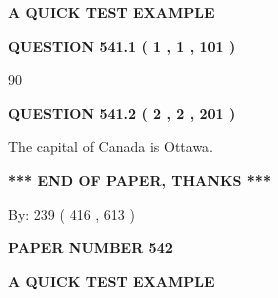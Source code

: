 \documentclass[12pt]{article}
\begin{document}
   
 \vspace{0.2in}
{\LARGE {\textbf{ A QUICK TEST EXAMPLE}}}
   
   
  
\vspace{0.2in}
  
{\textbf{\Large{QUESTION
541.1 
 ( 1 , 1 , 101 )
}}}
  
  
 
 
\noindent{}

90
 
 
  
\vspace{0.2in}
  
{\textbf{\Large{QUESTION
541.2 
 ( 2 , 2 , 201 )
}}}
  
  
 
 
\noindent{}
 
 
The capital of Canada is Ottawa.
 
 
 
 
   
   
 \vspace{0.2in}
 
   
   
   
   
\vspace{1.0in} 
{\textbf{\large{ *** END OF PAPER, THANKS *** }}} 
   
   
\hspace{1.0in} By: 
 239 ( 416 ,  613 )
   
   
   
   
\newpage 
\setcounter{page}{ 
   542001 } 
   
   
   
   
 {\textbf{ \Large{ PAPER NUMBER  542  }}}
   
   
\vspace{0.2in}
   
   
   
   
   
   
 \vspace{0.2in}
{\LARGE {\textbf{ A QUICK TEST EXAMPLE}}}
   
   
  
\vspace{0.2in}
  
\end{document}

